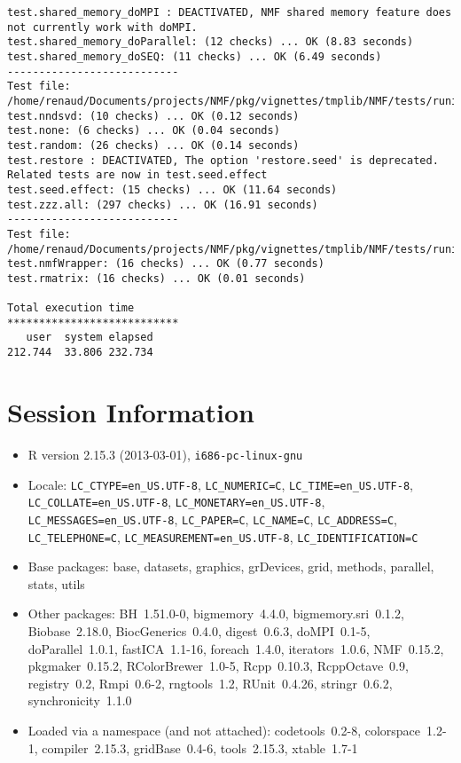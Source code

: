 \documentclass[10pt]{article}
\begin{document}
\begin{verbatim}
test.shared_memory_doMPI : DEACTIVATED, NMF shared memory feature does not currently work with doMPI.
test.shared_memory_doParallel: (12 checks) ... OK (8.83 seconds)
test.shared_memory_doSEQ: (11 checks) ... OK (6.49 seconds)
--------------------------- 
Test file: /home/renaud/Documents/projects/NMF/pkg/vignettes/tmplib/NMF/tests/runit.seed.r 
test.nndsvd: (10 checks) ... OK (0.12 seconds)
test.none: (6 checks) ... OK (0.04 seconds)
test.random: (26 checks) ... OK (0.14 seconds)
test.restore : DEACTIVATED, The option 'restore.seed' is deprecated. Related tests are now in test.seed.effect
test.seed.effect: (15 checks) ... OK (11.64 seconds)
test.zzz.all: (297 checks) ... OK (16.91 seconds)
--------------------------- 
Test file: /home/renaud/Documents/projects/NMF/pkg/vignettes/tmplib/NMF/tests/runit.utils.r 
test.nmfWrapper: (16 checks) ... OK (0.77 seconds)
test.rmatrix: (16 checks) ... OK (0.01 seconds)

Total execution time
***************************
   user  system elapsed 
212.744  33.806 232.734 

\end{verbatim}

\section*{Session Information}
\begin{itemize}\raggedright
  \item R version 2.15.3 (2013-03-01), \verb|i686-pc-linux-gnu|
  \item Locale: \verb|LC_CTYPE=en_US.UTF-8|, \verb|LC_NUMERIC=C|, \verb|LC_TIME=en_US.UTF-8|, \verb|LC_COLLATE=en_US.UTF-8|, \verb|LC_MONETARY=en_US.UTF-8|, \verb|LC_MESSAGES=en_US.UTF-8|, \verb|LC_PAPER=C|, \verb|LC_NAME=C|, \verb|LC_ADDRESS=C|, \verb|LC_TELEPHONE=C|, \verb|LC_MEASUREMENT=en_US.UTF-8|, \verb|LC_IDENTIFICATION=C|
  \item Base packages: base, datasets, graphics, grDevices, grid,
    methods, parallel, stats, utils
  \item Other packages: BH~1.51.0-0, bigmemory~4.4.0,
    bigmemory.sri~0.1.2, Biobase~2.18.0, BiocGenerics~0.4.0,
    digest~0.6.3, doMPI~0.1-5, doParallel~1.0.1, fastICA~1.1-16,
    foreach~1.4.0, iterators~1.0.6, NMF~0.15.2, pkgmaker~0.15.2,
    RColorBrewer~1.0-5, Rcpp~0.10.3, RcppOctave~0.9, registry~0.2,
    Rmpi~0.6-2, rngtools~1.2, RUnit~0.4.26, stringr~0.6.2,
    synchronicity~1.1.0
  \item Loaded via a namespace (and not attached): codetools~0.2-8,
    colorspace~1.2-1, compiler~2.15.3, gridBase~0.4-6, tools~2.15.3,
    xtable~1.7-1
\end{itemize}
\end{document}
